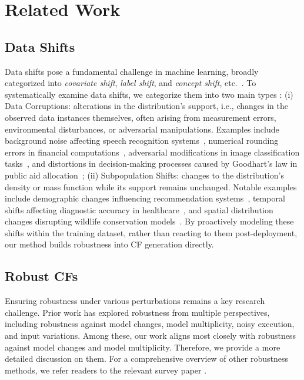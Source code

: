 \section{Related Work}




\subsection{Data Shifts}
Data shifts pose a fundamental challenge in machine learning, broadly categorized into \emph{covariate shift}, \emph{label shift}, and \emph{concept shift}, etc.~\cite{quionero2009dataset}. To systematically examine data shifts, we categorize them into two main types \cite{10.5555/3692070.3692237}:
(i) Data Corruptions: alterations in the distribution’s support, i.e., changes in the observed data instances themselves, often arising from measurement errors, environmental disturbances, or adversarial manipulations. Examples include background noise affecting speech recognition systems~\cite{kinoshita2020deep}, numerical rounding errors in financial computations~\cite{li2015rounding}, adversarial modifications in image classification tasks~\cite{goodfellow2020explaining}, and distortions in decision-making processes caused by Goodhart’s law in public aid allocation~\cite{camacho2011goodhart};
(ii) Subpopulation Shifts: changes to the distribution’s density or mass function while its support remains unchanged. Notable examples include demographic changes influencing recommendation systems~\cite{blodgett2016demographic,sapiezynski2017algorithmic}, temporal shifts affecting diagnostic accuracy in healthcare~\cite{pasterkamp2017moving}, and spatial distribution changes disrupting wildlife conservation models~\cite{beery2021iwildcam}. By proactively modeling these shifts within the training dataset, rather than reacting to them post-deployment, our method builds robustness into CF generation directly.

\subsection{Robust CFs}

Ensuring robustness under various perturbations remains a key research challenge. Prior work has explored robustness from multiple perspectives, including robustness against model changes, model multiplicity, noisy execution, and input variations. Among these, our work aligns most closely with robustness against model changes and model multiplicity. Therefore, we provide a more detailed discussion on them. For a comprehensive overview of other robustness methods, we refer readers to the relevant survey paper \cite{ijcai2024p894}.

